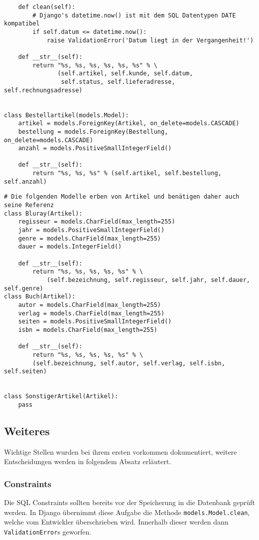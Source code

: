 \documentclass[a4paper,11pt]{article}
\begin{document}
\begin{small}
\begin{verbatim}
    def clean(self):
        # Django's datetime.now() ist mit dem SQL Datentypen DATE kompatibel
        if self.datum <= datetime.now():
            raise ValidationError('Datum liegt in der Vergangenheit!')

    def __str__(self):
        return "%s, %s, %s, %s, %s, %s" % \
               (self.artikel, self.kunde, self.datum,
                self.status, self.lieferadresse, self.rechnungsadresse)


class Bestellartikel(models.Model):
    artikel = models.ForeignKey(Artikel, on_delete=models.CASCADE)
    bestellung = models.ForeignKey(Bestellung, on_delete=models.CASCADE)
    anzahl = models.PositiveSmallIntegerField()

    def __str__(self):
        return "%s, %s, %s" % (self.artikel, self.bestellung, self.anzahl)

\end{verbatim}

\newpage
\begin{verbatim}
# Die folgenden Modelle erben von Artikel und benätigen daher auch seine Referenz
class Bluray(Artikel):
    regisseur = models.CharField(max_length=255)
    jahr = models.PositiveSmallIntegerField()
    genre = models.CharField(max_length=255)
    dauer = models.IntegerField()

    def __str__(self):
        return "%s, %s, %s, %s, %s" % \
            (self.bezeichnung, self.regisseur, self.jahr, self.dauer, self.genre)
class Buch(Artikel):
    autor = models.CharField(max_length=255)
    verlag = models.CharField(max_length=255)
    seiten = models.PositiveSmallIntegerField()
    isbn = models.CharField(max_length=255)

    def __str__(self):
        return "%s, %s, %s, %s, %s" % \
        (self.bezeichnung, self.autor, self.verlag, self.isbn, self.seiten)


class SonstigerArtikel(Artikel):
    pass
\end{verbatim}
\end{small}

\subsection*{Weiteres}
Wichtige Stellen wurden bei ihrem ersten vorkommen dokumentiert, weitere Entscheidungen werden in folgendem Absatz erläutert.

\subsubsection*{Constraints}
Die SQL Constraints sollten bereits vor der Speicherung in die Datenbank geprüft werden.
In Django übernimmt diese Aufgabe die Methode \texttt{models.Model.clean}, welche vom Entwickler überschrieben wird.
Innerhalb dieser werden dann \texttt{ValidationError}s geworfen.
\end{document}
